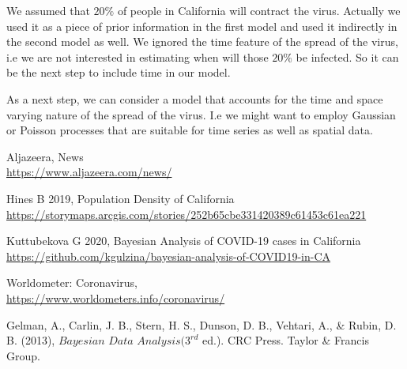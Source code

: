\documentclass[11pt,twocolumn]{asaproc}
\begin{document}
We assumed that $20\%$ of people in California will contract the virus. Actually we used it as a piece of prior information in the first model and used it indirectly in the second model as well. We ignored the time feature of the spread of the virus, i.e we are not interested in estimating when will those $20\%$ be infected. So it can be the next step to include time in our model. 

As a next step, we can consider a model that accounts for the time and space varying nature of the spread of the virus. I.e we might want to employ Gaussian or Poisson processes that are suitable for time series as well as spatial data. 





\begin{references}
\itemsep=0pt
{\footnotesize

\item
Aljazeera, News
\\\url{https://www.aljazeera.com/news/}

\item
Hines B 2019, Population Density of California
\\\url{https://storymaps.arcgis.com/stories/252b65cbe331420389c61453c61ea221}

\item
Kuttubekova G 2020, Bayesian Analysis of COVID-19 cases in California
\\\url{https://github.com/kgulzina/bayesian-analysis-of-COVID19-in-CA}

\item 
Worldometer: Coronavirus,
\\\url{https://www.worldometers.info/coronavirus/}


\item 
Gelman, A., Carlin, J. B., Stern, H. S., Dunson, D. B., Vehtari, A., \& Rubin, D. B. (2013), $\textit{Bayesian Data Analysis} (3^{rd}$ ed.). CRC Press. Taylor \& Francis Group.


}
\end{references}
\end{document}
